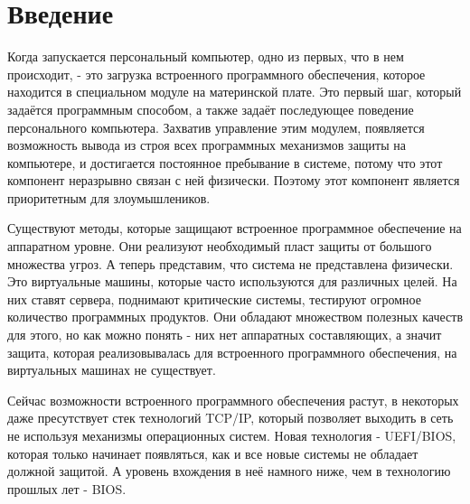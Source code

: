 \chapter{Введение}
Когда запускается персональный компьютер,
	одно из первых,
		что в нем происходит,
	- это загрузка встроенного программного обеспечения,
		которое находится в специальном модуле на материнской плате.
Это первый шаг,
	который задаётся программным способом,
	а также задаёт последующее поведение персонального компьютера.
Захватив управление этим модулем,
	появляется возможность вывода из строя всех программных механизмов защиты на компьютере,
	и достигается постоянное пребывание в системе,
		потому что этот компонент неразрывно связан с ней физически.
Поэтому этот компонент является приоритетным для злоумышлеников.

Существуют методы,
	которые защищают встроенное программное обеспечение на аппаратном уровне.
Они реализуют необходимый пласт защиты от большого множества угроз.
А теперь представим,
	что система не представлена физически.
Это виртуальные машины,
	которые часто используются для различных целей.
На них ставят сервера, поднимают критические системы, тестируют огромное количество программных продуктов.
Они обладают множеством полезных качеств для этого,
	но как можно понять - них нет аппаратных составляющих,
		а значит защита,
			которая реализовывалась для встроенного программного обеспечения,
		на виртуальных машинах не существует.

Сейчас возможности встроенного программного обеспечения растут,
	в некоторых даже пресутствует стек технологий TCP/IP,
		который позволяет выходить в сеть не используя механизмы операционных систем.
Новая технология - UEFI/BIOS,
	которая только начинает появляться,
	как и все новые системы не обладает должной защитой.
А уровень вхождения в неё намного ниже,
	чем в технологию прошлых лет - BIOS.
